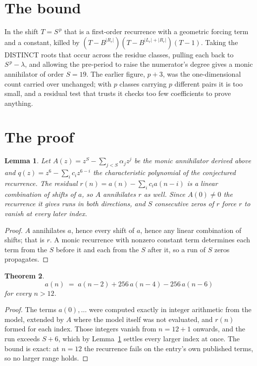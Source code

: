 \documentclass[11pt,a4paper]{article}
\theoremstyle{plain}
\newtheorem{theorem}{Theorem}
\newtheorem{lemma}[theorem]{Lemma}
\theoremstyle{definition}
\begin{document}
\section{The bound}

In the shift $T=S^{\,p}$ that is a first-order recurrence with a geometric forcing term and a
constant, killed by $(T-B^{|R_r|})(T-B^{|L_r|+|R_r|})(T-1)$. Taking the DISTINCT roots that
occur across the residue classes, pulling each back to $S^{\,p}-\lambda$, and allowing the
pre-period to raise the numerator's degree gives a monic annihilator of order $S=19$. The
earlier figure, $p+3$, was the one-dimensional count carried over unchanged; with $p$ classes
carrying $p$ different pairs it is too small, and a residual test that trusts it checks too few
coefficients to prove anything.

\section{The proof}

\begin{lemma}\label{lem:crit}
Let $A(z)=z^S-\sum_{j<S}\alpha_jz^{j}$ be the monic annihilator derived above and
$q(z)=z^{6}-\sum_ic_iz^{6-i}$ the characteristic polynomial of the conjectured
recurrence. The residual $r(n)=a(n)-\sum_ic_ia(n-i)$ is a linear combination of shifts of $a$,
so $A$ annihilates $r$ as well. Since $A(0)\ne0$ the recurrence it gives runs in both
directions, and $S$ consecutive zeros of $r$ force $r$ to vanish at every later index.
\end{lemma}

\begin{proof}
$A$ annihilates $a$, hence every shift of $a$, hence any linear combination of shifts; that is
$r$. A monic recurrence with nonzero constant term determines each term from the $S$ before it
and each from the $S$ after it, so a run of $S$ zeros propagates.
\end{proof}

\begin{theorem}
\[
a(n)\;=\;a(n-2) + 256\,a(n-4) - 256\,a(n-6)
\]
for every $n>12$.
\end{theorem}

\begin{proof}
The terms $a(0),\dots$ were computed exactly in integer arithmetic from the model, extended by
$A$ where the model itself was not evaluated, and $r(n)$ formed for each index. Those integers
vanish from $n=12+1$ onwards, and the run exceeds $S+6$, which by
Lemma~\ref{lem:crit} settles every larger index at once. The bound is exact: at $n=12$ the recurrence fails on the entry's own published terms, so no larger range holds.
\end{proof}
\end{document}
